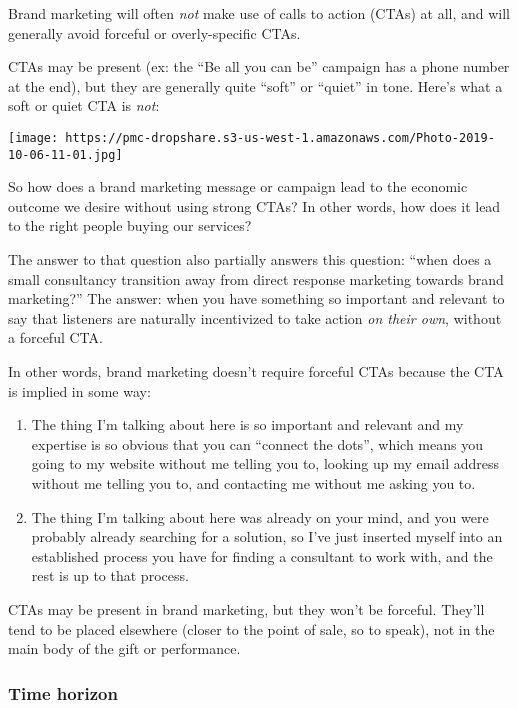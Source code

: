 \documentclass[13pt,]{tufte-handout}
\providecommand{\tightlist}{%
  \setlength{\itemsep}{0pt}\setlength{\parskip}{0pt}}
\begin{document}
Brand marketing will often \emph{not} make use of calls to action (CTAs)
at all, and will generally avoid forceful or overly-specific CTAs.

CTAs may be present (ex: the ``Be all you can be'' campaign has a phone
number at the end), but they are generally quite ``soft'' or ``quiet''
in tone. Here's what a soft or quiet CTA is \emph{not}:

\texttt{[image: https://pmc-dropshare.s3-us-west-1.amazonaws.com/Photo-2019-10-06-11-01.jpg]}

So how does a brand marketing message or campaign lead to the economic
outcome we desire without using strong CTAs? In other words, how does it
lead to the right people buying our services?

The answer to that question also partially answers this question: ``when
does a small consultancy transition away from direct response marketing
towards brand marketing?'' The answer: when you have something so
important and relevant to say that listeners are naturally incentivized
to take action \emph{on their own}, without a forceful CTA.

In other words, brand marketing doesn't require forceful CTAs because
the CTA is implied in some way:

\begin{enumerate}
\def\labelenumi{\arabic{enumi}.}
\tightlist
\item
  The thing I'm talking about here is so important and relevant and my
  expertise is so obvious that you can ``connect the dots'', which means
  you going to my website without me telling you to, looking up my email
  address without me telling you to, and contacting me without me asking
  you to.
\item
  The thing I'm talking about here was already on your mind, and you
  were probably already searching for a solution, so I've just inserted
  myself into an established process you have for finding a consultant
  to work with, and the rest is up to that process.
\end{enumerate}

CTAs may be present in brand marketing, but they won't be forceful.
They'll tend to be placed elsewhere (closer to the point of sale, so to
speak), not in the main body of the gift or performance.

\hypertarget{time-horizon}{%
\subsubsection{Time horizon}\label{time-horizon}}
\end{document}
